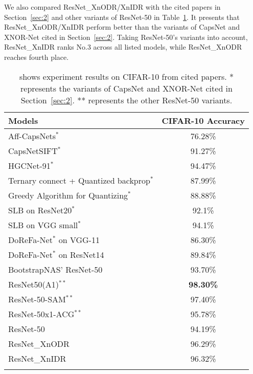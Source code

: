\documentclass[sn-mathphys,iicol,Numbered]{sn-jnl}
\begin{document}
We also compared ResNet\_XnODR/XnIDR with the cited papers in Section~\ref{sec:2} and other variants of ResNet-50 in Table~\ref{tab:resnet-cifar10}. It presents that ResNet\_XnODR/XnIDR perform better than the variants of CapsNet and XNOR-Net cited in Section~\ref{sec:2}. Taking ResNet-50's variants into account, ResNet\_XnIDR ranks No.3 across all listed models, while ResNet\_XnODR reaches fourth place.

\begin{table}[ht]
\caption{shows experiment results on CIFAR-10 from cited papers. * represents the variants of CapsNet and XNOR-Net cited in Section~\ref{sec:2}. ** represents the other ResNet-50 variants.} 
\begin{tabular}{@{}l|c@{}}
\toprule
Models & CIFAR-10 Accuracy \\
\midrule
Aff-CapsNets$^{*}$ \citep{A24_Rob_Caps} & 76.28\% \\
CapsNetSIFT$^{*}$ \citep{A44_CapsnetSIFT} & 91.27\% \\
HGCNet-91$^{*}$ \citep{A43_high_eff} & 94.47\% \\
\multirow{2}{4.cm}{Ternary connect + Quantized backprop$^{*}$ 
 \citep{A37_mul}} & \multirow{2}{*}{87.99\%} \\ 
 & \\
\multirow{2}{4.cm}{Greedy Algorithm for Quantizing$^{*}$ \citep{A39_grdy}} & \multirow{2}{*}{88.88\%} \\
 & \\
SLB on ResNet20$^{*}$ \citep{A40_low_bit} & 92.1\% \\
SLB on VGG small$^{*}$ \citep{A40_low_bit} & 94.1\% \\
DoReFa-Net$^{*}$ on VGG-11 \citep{A41_prune} & 86.30\% \\
DoReFa-Net$^{*}$ on ResNet14 \citep{A41_prune} & 89.84\% \\
\midrule
BootstrapNAS’ ResNet-50~ \citep{A61_BootstrapNAS} & 93.70\% \\
ResNet50(A1)$^{**}$~\citep{A72_ResNet50_A1} & \textbf{98.30\%} \\
ResNet-50-SAM$^{**}$~\citep{A73_ResNet50-Sam} & 97.40\% \\
ResNet-50x1-ACG$^{**}$~\citep{A74_ResNet50x1-ACG} & 95.78\% \\
\midrule
ResNet-50 & 94.19\% \\
ResNet\_XnODR & 96.29\% \\
ResNet\_XnIDR & 96.32\% \\
\botrule
\end{tabular} \label{tab:resnet-cifar10}
\end{table}
\end{document}
